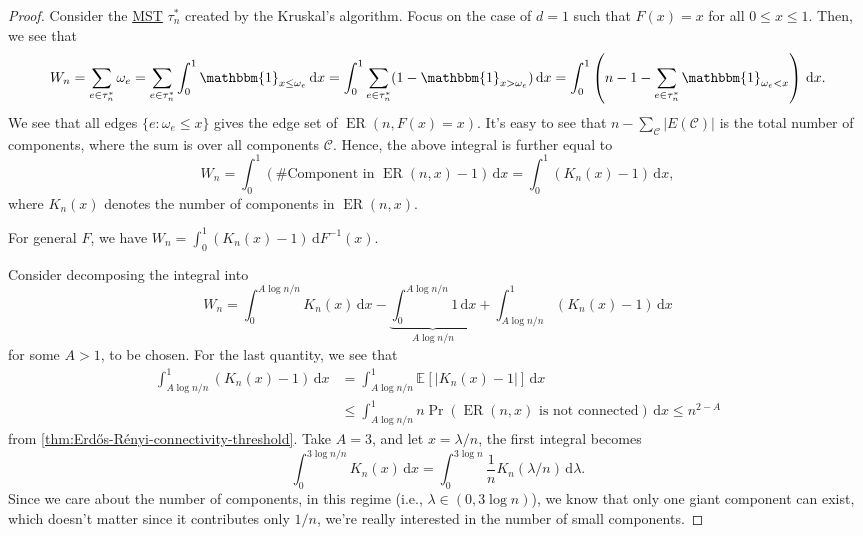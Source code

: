 \begin{proof}
	Consider the \hyperref[prb:MST]{MST} \(\tau _n^{\ast} \) created by the Kruskal's algorithm. Focus on the case of \(d = 1\) such that \(F(x) = x\) for all \(0 \leq x \leq 1\). Then, we see that
	\[
		W_n
		= \sum_{e \in \tau _n^{\ast} } \omega _e
		= \sum_{e \in \tau _n^{\ast} } \int_{0}^{1} \mathbbm{1}_{x \leq \omega _e} \,\mathrm{d}x
		= \int_{0}^{1} \sum_{e \in \tau _n^{\ast} } (1 - \mathbbm{1}_{x > \omega _e} ) \,\mathrm{d}x
		= \int_{0}^{1} \left( n-1 - \sum_{e \in \tau _n^{\ast} } \mathbbm{1}_{\omega _e < x} \right) \,\mathrm{d}x .
	\]
	We see that all edges \(\{ e \colon \omega _e \leq x \} \) gives the edge set of \(\operatorname{ER}(n, F(x) = x) \). It's easy to see that \(n - \sum_{\mathcal{C} } \lvert E(\mathcal{C} ) \rvert \) is the total number of components, where the sum is over all components \(\mathcal{C} \). Hence, the above integral is further equal to
	\[
		W_n
		= \int_{0}^{1} \left( \text{\#Component in } \operatorname{ER}(n, x) - 1 \right) \,\mathrm{d}x
		= \int_{0}^{1} (K_n(x) - 1) \,\mathrm{d}x ,
	\]
	where \(K_n(x)\) denotes the number of components in \(\operatorname{ER}(n, x) \).

	\begin{note}
		For general \(F\), we have \(W_n = \int_{0}^{1} (K_n(x) - 1) \,\mathrm{d}F^{-1} (x) \).
	\end{note}

	Consider decomposing the integral into
	\[
		W_n
		= \int_{0}^{A \log n / n} K_n(x) \,\mathrm{d}x
		- \underbrace{\int_{0}^{A \log n / n} 1 \,\mathrm{d}x}_{A \log n / n}
		+ \int_{A \log n / n}^{1} (K_n(x) - 1) \,\mathrm{d}x
	\]
	for some \(A > 1\), to be chosen. For the last quantity, we see that
	\[
		\begin{split}
			\int_{A \log n / n}^{1} (K_n(x) - 1) \,\mathrm{d}x
			 & = \int_{A \log n / n}^{1} \mathbb{E}_{}[\lvert K_n(x) - 1 \rvert ]  \,\mathrm{d}x                                  \\
			 & \leq \int_{A \log n / n}^{1} n \Pr_{}\left(\operatorname{ER}(n, x) \text{ is not connected} \right)  \,\mathrm{d}x
			\leq n^{2 - A}
		\end{split}
	\]
	from \autoref{thm:Erdős-Rényi-connectivity-threshold}. Take \(A = 3\), and let \(x = \lambda / n\), the first integral becomes
	\[
		\int_{0}^{3 \log n / n} K_n(x) \,\mathrm{d}x
		= \int_{0}^{3 \log n} \frac{1}{n} K_n(\lambda / n) \,\mathrm{d}\lambda .
	\]
	Since we care about the number of components, in this regime (i.e., \(\lambda \in (0, 3 \log n)\)), we know that only one giant component can exist, which doesn't matter since it contributes only \(1 / n\), we're really interested in the number of small components.


\end{proof}
